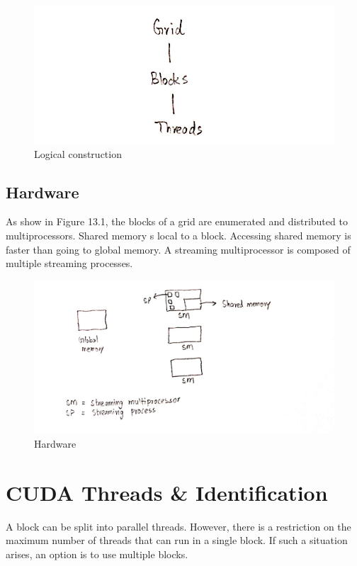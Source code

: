 \documentclass[twoside]{article}
\begin{document}
\begin{figure}
  \includegraphics[width=\linewidth]{img/lc.png}
  \caption{Logical construction}
\end{figure}

\subsection{Hardware}

As show in Figure 13.1, the blocks of a grid are enumerated and distributed to 
multiprocessors. Shared memory s local to a block. Accessing shared memory
is faster than going to global memory. A streaming multiprocessor is composed of
multiple streaming processes.

\begin{figure}
  \includegraphics[width=\linewidth]{img/hardware.png}
  \caption{Hardware}
\end{figure}

\section{CUDA Threads \& Identification}

A block can be split into parallel threads. However, there is a restriction
on the maximum number of threads that can run in a single block. If such a
situation arises, an option is to use multiple blocks.
\end{document}
